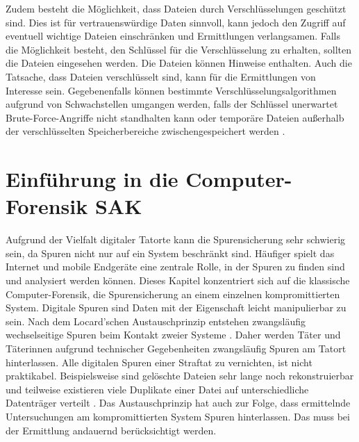 \documentclass[12pt,DIV=14, version=first, BCOR=10mm,a4paper,twoside,parskip=half-,headsepline,headinclude]{scrartcl}
\begin{document}
    Zudem besteht die Möglichkeit, dass Dateien durch Verschlüsselungen geschützt sind. Dies ist für vertrauenswürdige Daten sinnvoll, kann jedoch den Zugriff auf eventuell wichtige Dateien einschränken und Ermittlungen verlangsamen. Falls die Möglichkeit besteht, den Schlüssel für die Verschlüsselung zu erhalten, sollten die Dateien eingesehen werden. Die Dateien können Hinweise enthalten. Auch die Tatsache, dass Dateien verschlüsselt sind, kann für die Ermittlungen von Interesse sein. Gegebenenfalls können bestimmte Verschlüsselungsalgorithmen aufgrund von Schwachstellen umgangen werden, falls der Schlüssel unerwartet Brute-Force-Angriffe nicht standhalten kann \cite[vgl. S. 35]{texbook03} oder temporäre Dateien außerhalb der verschlüsselten Speicherbereiche zwischengespeichert werden \cite[vgl. S. 76]{texbook01}.

\section{Einführung in die Computer-Forensik SAK}
    Aufgrund der Vielfalt digitaler Tatorte kann die Spurensicherung sehr schwierig sein, da Spuren nicht nur auf ein System beschränkt sind. Häufiger spielt das Internet und mobile Endgeräte eine zentrale Rolle, in der Spuren zu finden sind und analysiert werden können. Dieses Kapitel konzentriert sich auf die klassische Computer-Forensik, die Spurensicherung an einem einzelnen kompromittierten System. Digitale Spuren sind Daten mit der Eigenschaft leicht manipulierbar zu sein. Nach dem Locard’schen Austauschprinzip entstehen zwangsläufig wechselseitige Spuren beim Kontakt zweier Systeme \cite[vgl. S. 21]{texbook03}. Daher werden Täter und Täterinnen aufgrund technischer Gegebenheiten zwangsläufig Spuren am Tatort hinterlassen. Alle digitalen Spuren einer Straftat zu vernichten, ist nicht praktikabel. Beispielsweise sind gelöschte Dateien sehr lange noch rekonstruierbar und teilweise existieren viele Duplikate einer Datei auf unterschiedliche Datenträger verteilt \cite[vgl. S. 115]{texbook02}. Das Austauschprinzip hat auch zur Folge, dass ermittelnde Untersuchungen am kompromittierten System Spuren hinterlassen. Das muss bei der Ermittlung andauernd berücksichtigt werden.
    
\end{document}
